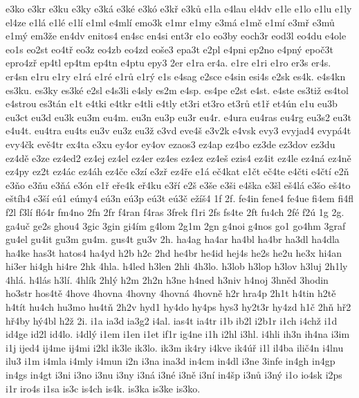 {e3ko
e3kr
e3ku
e3ky
e3k\'a
e3k\'e
e3k\'o
e3k\v r
e3k\r u
e1la
e4lau
el4dv
e1le
e1lo
e1lu
e1ly
el4ze
e1l\'a
e1l\'e
e1l\'i
e1ml
e4ml\'i
emo3k
e1mr
e1my
e3m\'a
e1m\v e
e1m\'i
e3m\v r
e3m\r u
e1m\'y
em3\v ze
en4dv
enitos4
en4sc
en4si
ent3r
e1o
eo3by
eoch3r
eod3l
eo4du
e4ole
eo1s
eo2st
eo4t\v r
eo3z
eo4zb
eo4zd
eo\v se3
epa3t
e2pl
e4pni
ep2no
e4pn\'y
epo\v c3t
epro4z\v r
ep4tl
ep4tm
ep4tn
e4ptu
epy3
2er
e1ra
er4a.
e1re
e1ri
e1ro
er3s
er4s.
er4sn
e1ru
e1ry
e1r\'a
e1r\'e
e1r\r u
e1r\'y
e1s
e4sag
e2sce
e4sin
esi4s
e2sk
es4k.
e4s4kn
es3ku.
es3ky
es3k\'e
e2sl
e4s3li
e4sly
es2m
e4sp.
es4pe
e2st
e4st.
e4ste
es3ti\v z
es4tol
e4strou
es3t\'an
e1t
e4tki
e4tkr
e4tli
e4tly
et3ri
et3ro
et3r\r u
et1\v r
et4\'un
e1u
eu3b
eu3ct
eu3d
eu3k
eu3m
eu4m.
eu3n
eu3p
eu3r
eu4r.
e4ura
eu4ras
eu4rg
eu3s2
eu3t
e4u4t.
eu4tra
eu4ts
eu3v
eu3z
eu3\v z
e3vd
eve4\v s
e3v2k
e4vsk
evy3
evyjad4
evyp\'a4t
evy4\v ck
ev\v e4tr
ex4ta
e3xu
ey4or
ey4ov
ezaos3
ez4ap
ez4bo
ez3de
ez3dov
ez3du
ez4d\v e
e3ze
ez4ed2
ez4ej
ez4el
ez4er
ez4es
ez4ez
ez4e\v s
ezis4
ez4it
ez4le
ez4n\'a
ez4n\v e
ez4py
ez2t
ez4\'ac
ez4\'ah
ez4\v ce
e3z\'i
e3z\v r
ez4\v re
e1\'a
e\v c4kat
e1\v ct
e\v c4te
e4\v cti
e4\v ct\'i
e2\v n
e3\v no
e3\v nu
e3\v n\'a
e3\'on
e1\v r
e\v re4k
e\v r4ku
e3\v r\'i
e2\v s
e3\v se
e3\v si
e4\v ska
e3\v sl
e\v s4l\'a
e3\v so
e\v s4to
e\v st\'ih4
e3\v s\'i
e\'u1
e\'umy4
e\'u3n
e\'u3p
e\'u3t
e\'u3\v c
e\v z\'i\v s4
1f
2f.
fe4in
fene4
fe4ue
fi4em
fi4fl
f2l
f3l\'i
fl\'o4r
fm4no
2fn
2fr
f4ran
f4ras
3frek
f1ri
2fs
fs4te
2ft
fu4ch
2f\'e
f2\'u
1g
2g.
ga4u\v c
ge2s
ghou4
3gic
3gin
gi4\'im
g4lom
2g1m
2gn
g4noi
g4nos
go1
go4hm
3graf
gu4el
gu4it
gu3m
gu4m.
gus4t
gu3v
2h.
ha4ag
ha4ar
ha4bl
ha4br
ha3dl
ha4dla
ha4ke
has3t
hatos4
ha4yd
h2b
h2c
2hd
he4br
he4id
hej4s
he2s
he2u
he3x
hi4an
hi3er
hi4gh
hi4re
2hk
4hla.
h4led
h3len
2hli
4h3lo.
h3lob
h3lop
h3lov
h3luj
2h1ly
4hl\'a.
h4l\'as
h3l\'i.
4hl\'ik
2hl\'y
h2m
2h2n
h3ne
h4ned
h3niv
h4noj
3hn\v ed
3hodin
ho3str
hos4t\v e
4hove
4hovna
4hovny
4hovn\'a
4hovn\v e
h2r
hra4p
2h1t
h4tin
h2t\v e
h4t\'it
hu4ch
hu3mo
hu4t\v n
2h2v
hyd1
hy4do
hy4ps
hys3
hy2t3r
hy4zd
h1\v c
2h\v n
h\v r2
h\v r4by
h\'y4bl
h2\v z
2i.
i1a
ia3d
ia3g2
i4al.
ias4t
ia4tr
i1b
ib2l
i2b1r
i1ch
i4ch\v z
i1d
id4ge
id2l
id4lo.
i4dl\'y
i1em
i1en
i1et
if1r
ig4ne
i1h
i2hl
i3hl.
i4hli
ih3n
ih4na
i3im
i1j
ijed4
ij4me
ij4mi
i2kl
ik3le
ik3lo.
ik3m
ik4ry
i4kve
ik4\'u\v r
i1l
il4ba
ili\v c4n
i4lnu
ilu3
i1m
i4mla
i4mly
i4mun
i2n
i3na
ina3d
in4cm
in4dl
i3ne
3infe
in4gh
in4gp
in4gs
in4gt
i3ni
i3no
i3nu
i3ny
i3n\'a
i3n\'e
i3n\v e
i3n\'i
in4\v sp
i3n\r u
i3n\'y
i1o
io4sk
i2ps
i1r
iro4s
i1sa
is3c
is4ch
is4k.
is3ka
is3ke
is3ko.
}

